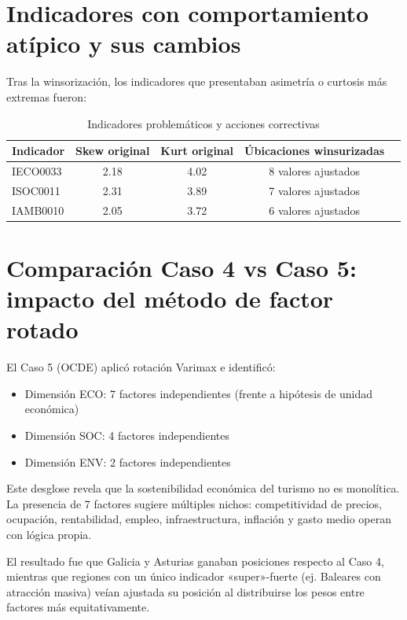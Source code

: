 \section{Indicadores con comportamiento atípico y sus cambios}

Tras la winsorización, los indicadores que presentaban asimetría o curtosis más extremas fueron:

\begin{table}[H]
    \centering
    \small
    \begin{tabular}{lcccc}
        \toprule
        \textbf{Indicador} & \textbf{Skew original} & \textbf{Kurt original} & \textbf{Úbicaciones winsurizadas} \\
        \midrule
        IECO0033 & 2.18 & 4.02 & 8 valores ajustados \\
        ISOC0011 & 2.31 & 3.89 & 7 valores ajustados \\
        IAMB0010 & 2.05 & 3.72 & 6 valores ajustados \\
        \bottomrule
    \end{tabular}
    \caption{Indicadores problemáticos y acciones correctivas}
    \label{tab:indicadores_problematicos}
\end{table}

\section{Comparación Caso 4 vs Caso 5: impacto del método de factor rotado}

El Caso 5 (OCDE) aplicó rotación Varimax e identificó:

\begin{itemize}
    \item Dimensión ECO: 7 factores independientes (frente a hipótesis de unidad económica)
    \item Dimensión SOC: 4 factores independientes
    \item Dimensión ENV: 2 factores independientes
\end{itemize}

Este desglose revela que la sostenibilidad económica del turismo no es monolítica. La presencia de 7 factores sugiere múltiples nichos: competitividad de precios, ocupación, rentabilidad, empleo, infraestructura, inflación y gasto medio operan con lógica propia.

El resultado fue que Galicia y Asturias ganaban posiciones respecto al Caso 4, mientras que regiones con un único indicador «super»-fuerte (ej. Baleares con atracción masiva) veían ajustada su posición al distribuirse los pesos entre factores más equitativamente.

